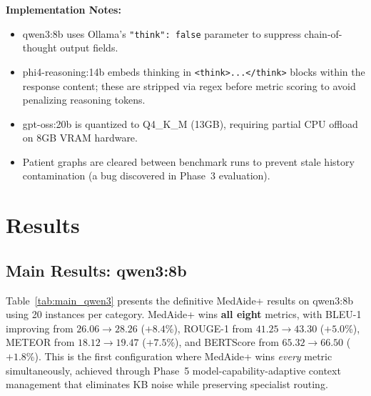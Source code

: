 \documentclass[conference]{IEEEtran}
\begin{document}
\textbf{Implementation Notes:}
\begin{itemize}[noitemsep,topsep=2pt]
    \item qwen3:8b uses Ollama's \texttt{"think": false} parameter to suppress chain-of-thought output fields.
    \item phi4-reasoning:14b embeds thinking in \texttt{<think>...</think>} blocks within the response content; these are stripped via regex before metric scoring to avoid penalizing reasoning tokens.
    \item gpt-oss:20b is quantized to Q4\_K\_M (13GB), requiring partial CPU offload on 8GB VRAM hardware.
    \item Patient graphs are cleared between benchmark runs to prevent stale history contamination (a bug discovered in Phase~3 evaluation).
\end{itemize}

\section{Results}
\label{sec:results}

\subsection{Main Results: qwen3:8b}

Table~\ref{tab:main_qwen3} presents the definitive MedAide+ results on qwen3:8b using 20 instances per category. MedAide+ wins \textbf{all eight} metrics, with BLEU-1 improving from $26.06 \rightarrow 28.26$ ($+8.4$\%), ROUGE-1 from $41.25 \rightarrow 43.30$ ($+5.0$\%), METEOR from $18.12 \rightarrow 19.47$ ($+7.5$\%), and BERTScore from $65.32 \rightarrow 66.50$ ($+1.8$\%). This is the first configuration where MedAide+ wins \emph{every} metric simultaneously, achieved through Phase~5 model-capability-adaptive context management that eliminates KB noise while preserving specialist routing.
\end{document}
